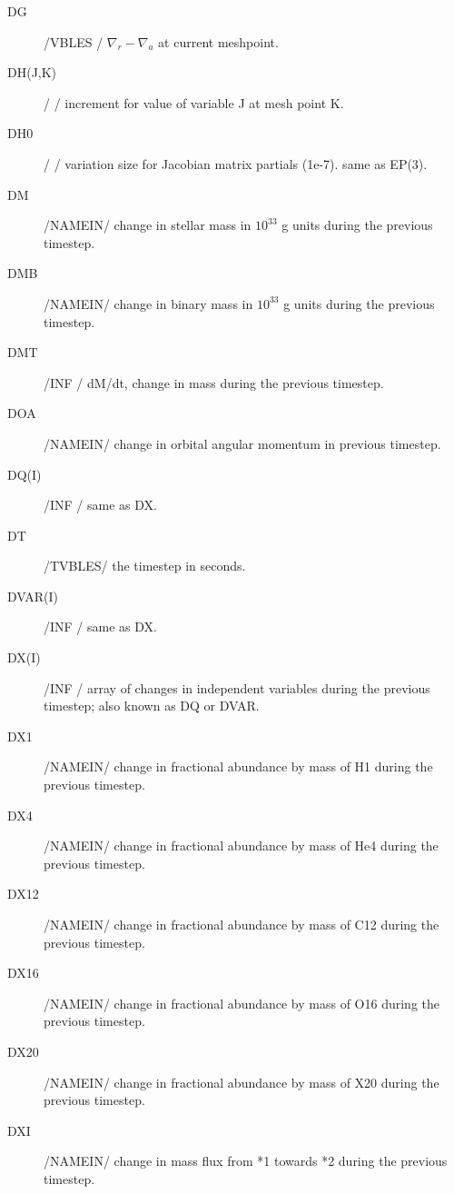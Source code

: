 \documentclass{article}
\begin{document}
\begin{description}
	\item[DG]		    /VBLES / $\nabla_r-\nabla_a$ at current meshpoint.

	\item[DH(J,K)]		/      / increment for value of variable J at mesh point K.

	\item[DH0]		    /      / variation size for Jacobian matrix partials (1e-7).  same as EP(3).
					
	\item[DM]		    /NAMEIN/ change in stellar mass in $10^{33}$ g units during the previous timestep.

	\item[DMB]     	/NAMEIN/  change in binary mass in  $10^{33}$ g units during the previous timestep.

	\item[DMT]		    /INF   / dM/dt, change in mass during the previous timestep.

	\item[DOA]     	/NAMEIN/ change in orbital angular momentum in previous timestep.

	\item[DQ(I)]	    /INF   / same as DX.

	\item[DT]		    /TVBLES/ the timestep in seconds.
	
	\item[DVAR(I)] 	/INF   / same as DX.

	\item[DX(I)]      /INF   / array of changes in independent variables during the previous timestep;
	                     also known as DQ or DVAR.
	
	\item[DX1]     	/NAMEIN/ change in fractional abundance by mass of H1 during the previous timestep.

	\item[DX4]     	/NAMEIN/ change in fractional abundance by mass of He4 during the previous timestep.

	\item[DX12]    	/NAMEIN/ change in fractional abundance by mass of C12 during the previous timestep.

	\item[DX16]    	/NAMEIN/ change in fractional abundance by mass of O16 during the previous timestep.

	\item[DX20]    	/NAMEIN/ change in fractional abundance by mass of X20 during the previous timestep.

	\item[DXI]     	/NAMEIN/ change in mass flux from *1 towards *2 during the previous timestep.

\end{description}
\end{document}
